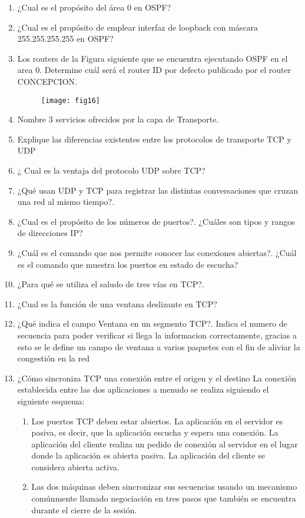 \documentclass{udparticle}
\begin{document}
\begin{enumerate}
\item ¿Cual es el propósito del área 0 en OSPF?
\item ¿Cual es el propósito de emplear interfaz de loopback con máscara
255.255.255.255 en OSPF?
\item Los routers de la Figura siguiente que  se encuentra ejecutando OSPF en el 
area 0. 
Determine cuál será el router ID por defecto publicado por el router 
CONCEPCION.
	\begin{figure}[H]
	\centering
	\texttt{[image: fig16]}
	\end{figure}
\item Nombre 3 servicios ofrecidos por la capa de Transporte.
\item Explique las diferencias existentes entre los protocolos de 
transporte TCP y UDP
\item ¿ Cual es la ventaja del protocolo UDP sobre TCP?
\item ¿Qué usan UDP y TCP para registrar las distintas conversaciones 
que cruzan una red al mismo tiempo?.
\item ¿Cual es el propósito de los números de puertos?. ¿Cuáles son 
tipos y rangos de direcciones IP?
\item ¿Cuál es el comando que nos permite conocer las conexiones 
abiertas?. 
¿Cuál es el comando que muestra los puertos en estado de escucha?
\item ¿Para qué se utiliza el saludo de tres vías en TCP?.
\item ¿Cual es la función de una ventana deslizante en TCP?
\item ¿Qué indica el campo Ventana en un segmento TCP?.
Indica el numero de secuencia para poder verificar si llega la informacion correctamente,
 gracias a esto se le define un campo de ventana a varios paquetes con el fin de aliviar la congestión en la red
\item ¿Cómo sincroniza TCP una conexión entre el origen y el destino 
La conexión establecida entre las dos aplicaciones a menudo se realiza siguiendo el siguiente esquema:
\begin{enumerate}
\item Los puertos TCP deben estar abiertos.
La aplicación en el servidor es pasiva, es decir, que la aplicación escucha y espera una conexión.
La aplicación del cliente realiza un pedido de conexión al servidor en el lugar donde la aplicación es abierta pasiva. La aplicación del cliente se considera abierta activa.
\item
Las dos máquinas deben sincronizar sus secuencias usando un mecanismo comúnmente llamado negociación en tres pasos que también se encuentra durante el cierre de la sesión.

\end{enumerate}
\end{enumerate}
\end{document}
